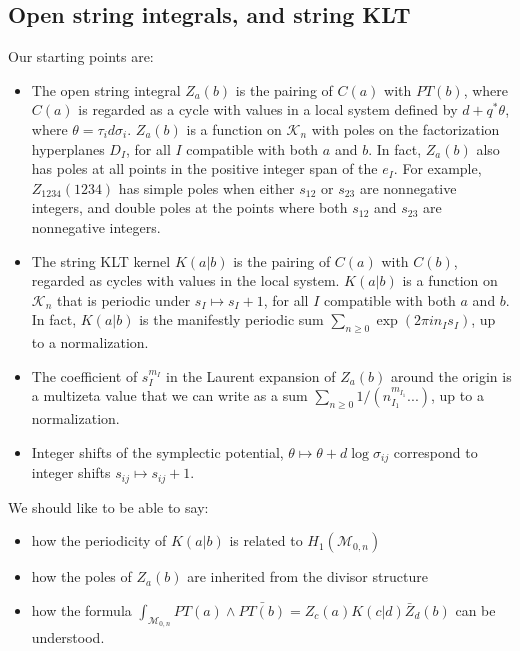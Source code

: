 \documentclass[11pt]{article}
\newcommand{\cK}{\mathcal{K}}
\newcommand{\cM}{\mathcal{M}}
\newcommand{\1}{{\rm 1\hskip-0.25em I}}
\begin{document}
\subsection{Open string integrals, and string KLT}
Our starting points are:
\begin{itemize}
\item The open string integral $Z_a(b)$ is the pairing of $C(a)$ with $PT(b)$, where $C(a)$ is regarded as a cycle with values in a local system defined by $d+q^* \theta$, where $\theta = \tau_id\sigma_i$. $Z_a(b)$ is a function on $\cK_n$ with poles on the factorization hyperplanes $D_I$, for all $I$ compatible with both $a$ and $b$. In fact, $Z_a(b)$ also has poles at all points in the positive integer span of the $e_I$. For example, $Z_{1234}(1234)$ has simple poles when either $s_{12}$ or $s_{23}$ are nonnegative integers, and double poles at the points where both $s_{12}$ and $s_{23}$ are nonnegative integers.
\item The string KLT kernel $K(a|b)$ is the pairing of $C(a)$ with $C(b)$, regarded as cycles with values in the local system. $K(a|b)$ is a function on $\cK_n$ that is periodic under $s_{I}\mapsto s_{I}+1$, for all $I$ compatible with both $a$ and $b$. In fact, $K(a|b)$ is the manifestly periodic sum $\sum_{n\geq 0} \exp(2\pi in_I s_I)$, up to a normalization.
\item The coefficient of $s_I^{m_I}$ in the Laurent expansion of $Z_a(b)$ around the origin is a multizeta value that we can write as a sum $\sum_{n\geq 0} 1/(n_{I_1}^{m_{I_1}}...)$, up to a normalization.
\item Integer shifts of the symplectic potential, $\theta \mapsto \theta + d\log\sigma_{ij}$ correspond to integer shifts $s_{ij}\mapsto s_{ij} + 1$. 
\end{itemize}
We should like to be able to say:
\begin{itemize}
\item how the periodicity of $K(a|b)$ is related to $H_1(\cM_{0,n})$
\item how the poles of $Z_a(b)$ are inherited from the divisor structure
\item how the formula $\int_{\cM_{0,n}} PT(a) \wedge\bar{PT(b)} = Z_c(a)K(c|d)\bar{Z}_d(b)$ can be understood.
\end{itemize}


  

\end{document}
